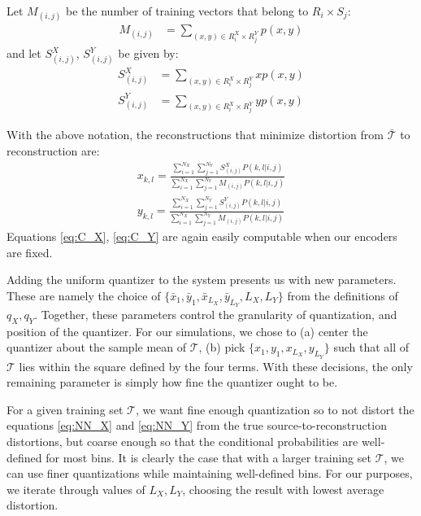 Let $M_{(i,j)}$ be the number of training vectors that belong to $R_i\times S_j$:
\begin{align}
    M_{(i,j)} &=
    \sum_{(x,y)\in R_i^X\times R_j^Y}p(x,y)
\end{align}
and let $S_{(i,j)}^X$, $S_{(i,j)}^Y$ be given by:
\begin{align}
    S^X_{(i,j)} &=
    \sum_{(x,y)\in R_i^X\times R_j^Y}x p(x,y)\\
    S^Y_{(i,j)} &=
    \sum_{(x,y)\in R_i^X\times R_j^Y}y p(x,y)
\end{align}

With the above notation, the reconstructions that minimize distortion from $\mathcal{\bar T}$ to reconstruction are:
\begin{align}
    \label{eq:C_X}
    x_{k,l} = 
        \frac{\sum_{i=1}^{N_X} \sum_{j=1}^{N_Y}
        S_{(i,j)}^X P(k,l|i,j)}
        {\sum_{i=1}^{N_X} \sum_{j=1}^{N_Y}
        M_{(i,j)} P(k,l|i,j)}\\
    \label{eq:C_Y}
    y_{k,l} = 
        \frac{\sum_{i=1}^{N_X} \sum_{j=1}^{N_Y}
        S_{(i,j)}^Y P(k,l|i,j)}
        {\sum_{i=1}^{N_X} \sum_{j=1}^{N_Y}
        M_{(i,j)} P(k,l|i,j)}
\end{align}
Equations \eqref{eq:C_X}, \eqref{eq:C_Y} are again easily computable when our encoders are fixed.

Adding the uniform quantizer to the system presents us with new parameters. These are namely the choice of $\{\bar x_1, \bar y_1, \bar x_{L_X}, \bar y_{L_Y}, L_X, L_Y\}$ from the definitions of $q_X,q_Y$. Together, these parameters control the granularity of quantization, and position of the quantizer. For our simulations, we chose to (a) center the quantizer about the sample mean of $\mathcal T$, (b) pick $\{x_1, y_1, x_{L_X}, y_{L_Y}\}$ such that all of $\mathcal T$ lies within the square defined by the four terms. With these decisions, the only remaining parameter is simply how fine the quantizer ought to be.

For a given training set $\mathcal T$, we want fine enough quantization so to not distort the equations \eqref{eq:NN_X} and \eqref{eq:NN_Y} from the true source-to-reconstruction distortions, but coarse enough so that the conditional probabilities are well-defined for most bins. It is clearly the case that with a larger training set $\mathcal T$, we can use finer quantizations while maintaining well-defined bins. For our purposes, we iterate through values of $L_X, L_Y$, choosing the result with lowest average distortion.

